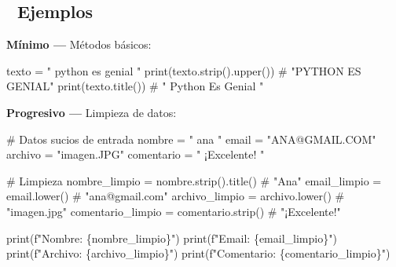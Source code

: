 \documentclass[
  doc,
  floatsintext,
  longtable,
  a4paper,
  nolmodern,
  notxfonts,
  notimes,
  12pt,
  colorlinks=true,linkcolor=blue,citecolor=blue,urlcolor=blue]{apa7}
\newenvironment{Shaded}{\begin{snugshade}}{\end{snugshade}}
\newcommand{\BuiltInTok}[1]{\textcolor[rgb]{0.00,0.23,0.31}{#1}}
\newcommand{\CommentTok}[1]{\textcolor[rgb]{0.37,0.37,0.37}{#1}}
\newcommand{\NormalTok}[1]{\textcolor[rgb]{0.00,0.23,0.31}{#1}}
\newcommand{\OperatorTok}[1]{\textcolor[rgb]{0.37,0.37,0.37}{#1}}
\newcommand{\SpecialCharTok}[1]{\textcolor[rgb]{0.37,0.37,0.37}{#1}}
\newcommand{\SpecialStringTok}[1]{\textcolor[rgb]{0.13,0.47,0.30}{#1}}
\newcommand{\StringTok}[1]{\textcolor[rgb]{0.13,0.47,0.30}{#1}}
\begin{document}
\subsection{🔬 Ejemplos}\label{ejemplos}

\textbf{Mínimo ---} Métodos básicos:

\begin{Shaded}
\begin{Highlighting}[]
\NormalTok{texto }\OperatorTok{=} \StringTok{"  python es genial  "}
\BuiltInTok{print}\NormalTok{(texto.strip().upper())   }\CommentTok{\# "PYTHON ES GENIAL"}
\BuiltInTok{print}\NormalTok{(texto.title())           }\CommentTok{\# "  Python Es Genial  "}
\end{Highlighting}
\end{Shaded}

\textbf{Progresivo ---} Limpieza de datos:

\begin{Shaded}
\begin{Highlighting}[]
\CommentTok{\# Datos sucios de entrada}
\NormalTok{nombre }\OperatorTok{=} \StringTok{"  ana  "}
\NormalTok{email }\OperatorTok{=} \StringTok{"ANA@GMAIL.COM"}
\NormalTok{archivo }\OperatorTok{=} \StringTok{"imagen.JPG"}
\NormalTok{comentario }\OperatorTok{=} \StringTok{"  ¡Excelente!   "}

\CommentTok{\# Limpieza}
\NormalTok{nombre\_limpio }\OperatorTok{=}\NormalTok{ nombre.strip().title()  }\CommentTok{\# "Ana"}
\NormalTok{email\_limpio }\OperatorTok{=}\NormalTok{ email.lower()            }\CommentTok{\# "ana@gmail.com"}
\NormalTok{archivo\_limpio }\OperatorTok{=}\NormalTok{ archivo.lower()        }\CommentTok{\# "imagen.jpg"}
\NormalTok{comentario\_limpio }\OperatorTok{=}\NormalTok{ comentario.strip()  }\CommentTok{\# "¡Excelente!"}

\BuiltInTok{print}\NormalTok{(}\SpecialStringTok{f"Nombre: }\SpecialCharTok{\{}\NormalTok{nombre\_limpio}\SpecialCharTok{\}}\SpecialStringTok{"}\NormalTok{)}
\BuiltInTok{print}\NormalTok{(}\SpecialStringTok{f"Email: }\SpecialCharTok{\{}\NormalTok{email\_limpio}\SpecialCharTok{\}}\SpecialStringTok{"}\NormalTok{)}
\BuiltInTok{print}\NormalTok{(}\SpecialStringTok{f"Archivo: }\SpecialCharTok{\{}\NormalTok{archivo\_limpio}\SpecialCharTok{\}}\SpecialStringTok{"}\NormalTok{)}
\BuiltInTok{print}\NormalTok{(}\SpecialStringTok{f"Comentario: }\SpecialCharTok{\{}\NormalTok{comentario\_limpio}\SpecialCharTok{\}}\SpecialStringTok{"}\NormalTok{)}
\end{Highlighting}
\end{Shaded}
\end{document}
